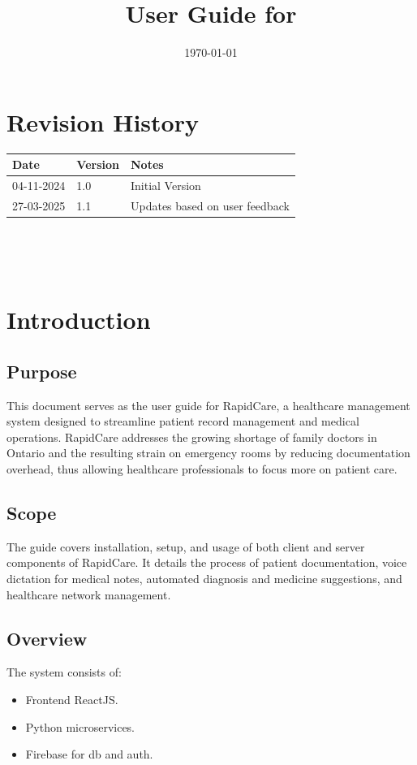 \documentclass[12pt, titlepage]{article}
\title{User Guide for \progname}
\author{\authname}
\date{\today}
\begin{document}
\maketitle


\section*{Revision History}

\begin{tabularx}{\textwidth}{p{3cm}p{2cm}X}
\toprule {\bf Date} & {\bf Version} & {\bf Notes}\\
\midrule
04-11-2024 & 1.0 & Initial Version\\
27-03-2025 & 1.1 & Updates based on user feedback\\
\bottomrule
\end{tabularx}

~\newpage

\tableofcontents

\listoffigures

~\newpage


\section{Introduction}
\subsection{Purpose}
This document serves as the user guide for RapidCare, a healthcare management system designed to streamline patient record management and medical operations. RapidCare addresses the growing shortage of family doctors in Ontario and the resulting strain on emergency rooms by reducing documentation overhead, thus allowing healthcare professionals to focus more on patient care.

\subsection{Scope}
The guide covers installation, setup, and usage of both client and server components of RapidCare. It details the process of patient documentation, voice dictation for medical notes, automated diagnosis and medicine suggestions, and healthcare network management.

\subsection{Overview}
The system consists of:
\begin{itemize}
\item Frontend ReactJS.
\item Python microservices.
\item Firebase for db and auth.
\end{itemize}
\end{document}
